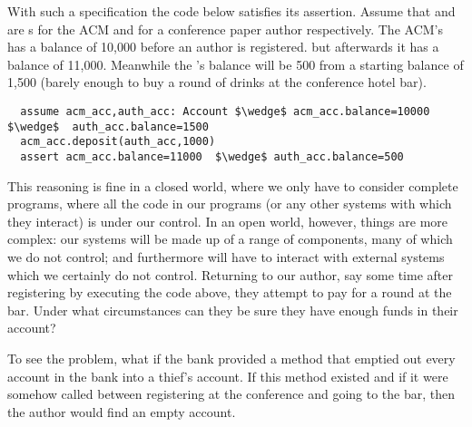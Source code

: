 
With such a specification %
the code below  satisfies its assertion. Assume that 
 and  are s for the ACM and
for a conference paper author respectively. The ACM's 
has a balance of 10,000 before an author is 
registered. but afterwards it has a balance of 11,000. Meanwhile the
's balance  will be 500 from a starting balance of 1,500
(barely enough to buy a round of drinks at the conference hotel bar).

\begin{lstlisting}
  assume acm_acc,auth_acc: Account $\wedge$ acm_acc.balance=10000 $\wedge$  auth_acc.balance=1500
  acm_acc.deposit(auth_acc,1000)
  assert acm_acc.balance=11000  $\wedge$ auth_acc.balance=500
\end{lstlisting}

\vspace{-.2in}

This reasoning is fine in a closed world, where we only have to
consider complete programs, where all the code in our programs (or any
other systems with which they interact) is under our control.   
In an
open world, however, things are more complex: our systems will be made
up of a range of 
components, many of which we do not control; and
furthermore will have to interact with external systems which we
certainly do not control.  Returning to our author, say some time
after registering by executing the  code above, they
attempt to pay for a round at the bar.  Under what circumstances can
they be sure they have enough funds in their account?

To see the problem, what if the bank provided a  method that 
 emptied out every account in the bank into a thief's account.
If this method existed and
if it were somehow called between registering at the conference and
going to the bar, then the author 
would find an empty account.
%

